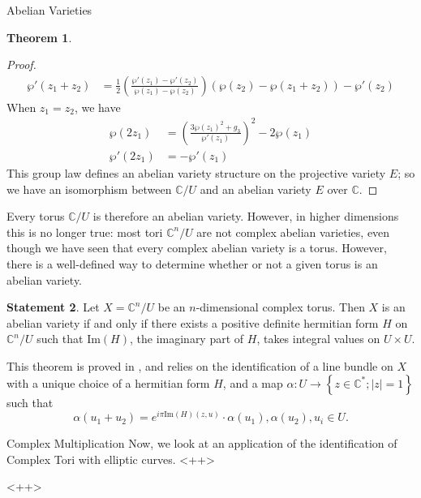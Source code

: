 \documentclass[12pt]{article}
\newcommand{\C}{\mathbb{C}}
\theoremstyle{definition}
\newtheorem{theorem}{Theorem}[section]
\newtheorem{statement}[theorem]{Statement}
\begin{document}
\begin{section}{Abelian Varieties}
\begin{theorem}
\begin{proof}
\begin{align*}
			\wp'(z_1 + z_2) &= \frac{1}{2}\left( \frac{\wp'(z_1) - \wp'(z_2)}{\wp(z_1) - \wp(z_2)} \right)(\wp(z_2) - \wp(z_1 + z_2)) - \wp'(z_2)\end{align*}
			When $z_1 = z_2$, we have
			\begin{align*}
				\wp(2z_1) &= \left( \frac{3\wp(z_1)^2 + g_3}{\wp'(z_1)} \right)^2 - 2\wp(z_1)\\
				\wp'(2z_1) &= -\wp'(z_1)
			\end{align*}
			This group law defines an abelian variety structure on the projective variety $E$; so we have an isomorphism between $\C/U$ and an abelian variety $E$ over $\C$.
		\end{proof}
		\label{ellcurve}
	\end{theorem}
	Every torus $\C/U$ is therefore an abelian variety. However, in higher dimensions this is no longer true: most tori $\C^n / U$ are not complex abelian varieties, even though we have seen that every complex abelian variety is a torus. However, there is a well-defined way to determine whether or not a given torus is an abelian variety.
	\begin{statement}
		Let $X = \C^n / U$ be an $n$-dimensional complex torus. Then $X$ is an abelian variety if and only if there exists a positive definite hermitian form $H$ on $\C^n / U$ such that $\text{Im}(H)$, the imaginary part of $H$, takes integral values on $U \times U$.	
		\par This theorem is proved in \cite{mumford}, and relies on the identification of a line bundle on $X$ with a unique choice of a hermitian form $H$, and a map $\alpha: U \to \left\{ z \in \C^* ; \left \lvert { z } \right \lvert  = 1 \right\}$ such that 
		\[\alpha(u_1 + u_2) = e^{i\pi \text{Im}(H)(z,u)} \cdot \alpha(u_1), \alpha(u_2), u_i \in U. \]
	\end{statement}
\end{section}
\begin{section}{Complex Multiplication}
	Now, we look at an application of the identification of Complex Tori with elliptic curves. <++>
\end{section}<++>
\begin{thebibliography}{}
\end{thebibliography}
\end{document}

